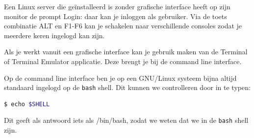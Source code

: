 Een Linux server die ge\"installeerd is zonder grafische interface heeft op zijn monitor de prompt Login: daar kan je
inloggen als gebruiker. Via de toets combinatie ALT en F1-F6 kan je schakelen naar verschillende consoles zodat je
meerdere keren ingelogd kan zijn.

Als je werkt vanuit een grafische interface kan je gebruik maken van de Terminal of Terminal Emulator applicatie. Deze brengt je bij de command line interface.

Op de command line interface ben je op een GNU/Linux systeem bijna altijd standaard ingelogd op de  \texttt{bash} shell. Dit kunnen we controlleren door in te typen:
\begin{lstlisting}[language=bash]
$ echo $SHELL
\end{lstlisting}
Dit geeft als antwoord iets als /bin/bash, zodat we weten dat we in de \texttt{bash} shell zijn.

